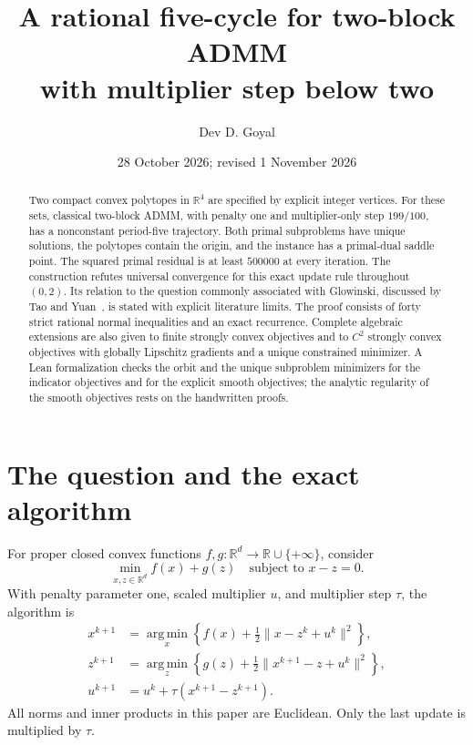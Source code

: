\documentclass[11pt,a4paper]{article}
\title{\textbf{A rational five-cycle for two-block ADMM\\with multiplier step below two}}
\author{Dev D. Goyal}
\date{28 October 2026; revised 1 November 2026}
\theoremstyle{remark}
\newcommand{\R}{\mathbb R}
\newcommand{\norm}[1]{\lVert #1\rVert}
\newcommand{\argmin}{\operatorname*{arg\,min}}
\begin{document}
\maketitle
\begin{abstract}
Two compact convex polytopes in $\R^4$ are specified by explicit integer vertices. For these sets, classical two-block ADMM, with penalty one and multiplier-only step $199/100$, has a nonconstant period-five trajectory. Both primal subproblems have unique solutions, the polytopes contain the origin, and the instance has a primal-dual saddle point. The squared primal residual is at least $500000$ at every iteration. The construction refutes universal convergence for this exact update rule throughout $(0,2)$. Its relation to the question commonly associated with Glowinski, discussed by Tao and Yuan~\cite{TaoYuan}, is stated with explicit literature limits. The proof consists of forty strict rational normal inequalities and an exact recurrence. Complete algebraic extensions are also given to finite strongly convex objectives and to $C^2$ strongly convex objectives with globally Lipschitz gradients and a unique constrained minimizer. A Lean formalization checks the orbit and the unique subproblem minimizers for the indicator objectives and for the explicit smooth objectives; the analytic regularity of the smooth objectives rests on the handwritten proofs.
\end{abstract}

\section{The question and the exact algorithm}\label{sec:question}
For proper closed convex functions $f,g:\R^d\to\R\cup\{+\infty\}$, consider
\begin{equation}\label{eq:problem}
\min_{x,z\in\R^d} f(x)+g(z)\quad\text{subject to }x-z=0.
\end{equation}
With penalty parameter one, scaled multiplier $u$, and multiplier step $\tau$, the algorithm is
\begin{align}
x^{k+1}&=\argmin_x\left\{f(x)+\tfrac12\norm{x-z^k+u^k}^2\right\},\label{eq:admmx}\\
z^{k+1}&=\argmin_z\left\{g(z)+\tfrac12\norm{x^{k+1}-z+u^k}^2\right\},\label{eq:admmz}\\
u^{k+1}&=u^k+\tau(x^{k+1}-z^{k+1}).\label{eq:admmu}
\end{align}
All norms and inner products in this paper are Euclidean. Only the last update is multiplied by $\tau$.
\end{document}
